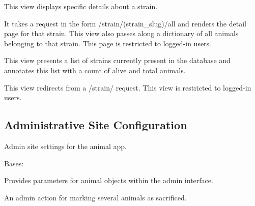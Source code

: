 \documentclass[letterpaper,10pt,english]{sphinxmanual}
\begin{document}
\begin{fulllineitems}
\begin{fulllineitems}
\label{api:animal.views.strain_detail_all}
This view displays specific details about a strain.

It takes a request in the form /strain/(strain\_slug)/all and renders the detail page for that strain.
This view also passes along a dictionary of all animals belonging to that strain.
This page is restricted to logged-in users.

\end{fulllineitems}


\begin{fulllineitems}
\label{api:animal.views.strain_list}
This view presents a list of strains currently present in the database and annotates this list with a count of alive and total animals.

This view redirects from a /strain/ request.
This view is restricted to logged-in users.

\end{fulllineitems}

\label{api:module-animal.urls}

\subsection{Administrative Site Configuration}
\label{api:id4}\label{api:module-animal.admin}
Admin site settings for the animal app.

\begin{fulllineitems}
\label{api:animal.admin.AnimalAdmin}
Bases: 

Provides parameters for animal objects within the admin interface.

\begin{fulllineitems}
\label{api:animal.admin.AnimalAdmin.mark_sacrificed}
An admin action for marking several animals as sacrificed.


\end{fulllineitems}
\end{fulllineitems}
\end{fulllineitems}
\end{document}
